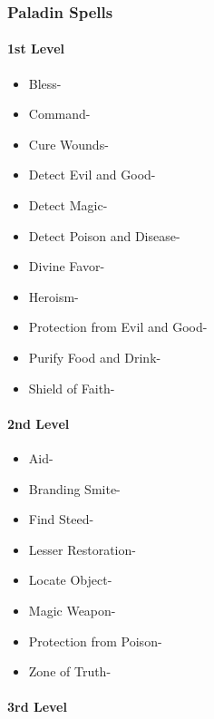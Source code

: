 \documentclass[
]{article}
\providecommand{\tightlist}{%
  \setlength{\itemsep}{0pt}\setlength{\parskip}{0pt}}
\begin{document}
\hypertarget{paladin-spells}{%
\subsubsection{Paladin Spells}\label{paladin-spells}}

\hypertarget{1st-level-3}{%
\paragraph{1st Level}\label{1st-level-3}}

\begin{itemize}
\tightlist
\item
  Bless-
\item
  Command-
\item
  Cure Wounds-
\item
  Detect Evil and Good-
\item
  Detect Magic-
\item
  Detect Poison and Disease-
\item
  Divine Favor-
\item
  Heroism-
\item
  Protection from Evil and Good-
\item
  Purify Food and Drink-
\item
  Shield of Faith-
\end{itemize}

\hypertarget{2nd-level-3}{%
\paragraph{2nd Level}\label{2nd-level-3}}

\begin{itemize}
\tightlist
\item
  Aid-
\item
  Branding Smite-
\item
  Find Steed-
\item
  Lesser Restoration-
\item
  Locate Object-
\item
  Magic Weapon-
\item
  Protection from Poison-
\item
  Zone of Truth-
\end{itemize}

\hypertarget{3rd-level-3}{%
\paragraph{3rd Level}\label{3rd-level-3}}
\end{document}
